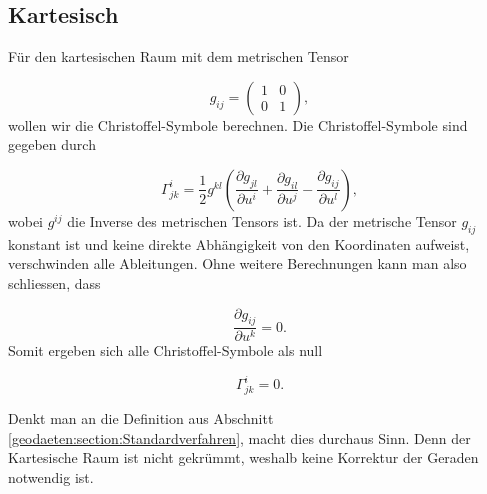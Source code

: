%
%
%
%
\subsection{Kartesisch\label{geodaeten:section:Standardverfahren:Kartesisch}}

Für den kartesischen Raum mit dem metrischen Tensor
 
\begin{equation}
g_{ij} = \begin{pmatrix} 
	1 & 0 \\ 
	0 & 1 
\end{pmatrix},
\end{equation}
wollen wir die Christoffel-Symbole berechnen.
Die Christoffel-Symbole sind gegeben durch

\begin{equation}
\Gamma^i_{jk} = \frac{1}{2} g^{kl} \left( \frac{\partial g_{jl}}{\partial u^i} + \frac{\partial g_{il}}{\partial u^j} - \frac{\partial g_{ij}}{\partial u^l} \right),
\end{equation}
wobei $g^{ij}$ die Inverse des metrischen Tensors ist.
Da der metrische Tensor $g_{ij}$ konstant ist und keine direkte Abhängigkeit von den Koordinaten aufweist, verschwinden alle Ableitungen.
Ohne weitere Berechnungen kann man also schliessen, dass

\begin{equation}
\frac{\partial g_{ij}}{\partial u^k} = 0 .
\end{equation}
Somit ergeben sich alle Christoffel-Symbole als null

\begin{equation}
\Gamma^i_{jk} = 0 .
\end{equation}

Denkt man an die Definition aus Abschnitt \ref{geodaeten:section:Standardverfahren}, macht dies durchaus Sinn.
Denn der Kartesische Raum ist nicht gekrümmt, weshalb keine Korrektur der Geraden notwendig ist.

